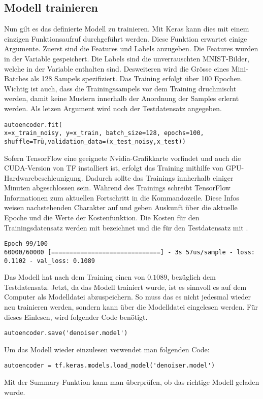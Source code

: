 \subsection{Modell trainieren}
Nun gilt es das definierte Modell zu trainieren.
Mit Keras kann dies mit einem einzigen Funktionsaufruf durchgeführt werden.
Diese Funktion erwartet einige Argumente. Zuerst sind die Features und Labels anzugeben. Die
Features wurden in der Variable  gespeichert. Die Labels
sind die unverrauschten MNIST-Bilder, welche in der Variable  enthalten sind.
Desweiteren wird die Grösse eines Mini-Batches als 128 Sampels spezifiziert. Das
Training erfolgt über 100 Epochen.
Wichtig ist auch, dass die Trainingssampels vor dem Training druchmischt werden, damit keine Mustern
innerhalb der Anordnung der Samples erlernt werden. Als letzen Argument wird noch
der Testdatensatz angegeben.
\begin{verbatim}
autoencoder.fit(
x=x_train_noisy, y=x_train, batch_size=128, epochs=100, shuffle=Trü,validation_data=(x_test_noisy,x_test))
\end{verbatim}
Sofern TensorFlow eine geeignete Nvidia-Grafikkarte vorfindet und auch die
CUDA-Version von TF installiert ist, erfolgt das Training mithilfe von GPU-Hardwarebeschleunigung.
Dadurch sollte das Trainings innherhalb einiger Minuten abgeschlossen sein.
Während des Trainings schreibt TensorFlow Informationen zum aktuellen Fortschritt in die
Kommandozeile. Diese Infos weisen nachstehenden Charakter auf und geben Auskunft über die aktuelle Epoche und die
Werte der Kostenfunktion. Die Kosten für den Trainingsdatensatz werden mit
 bezeichnet und die für den Testdatensatz mit .
\begin{verbatim}
Epoch 99/100
60000/60000 [==============================] - 3s 57us/sample - loss: 0.1102 - val_loss: 0.1089
\end{verbatim}
Das Modell hat nach dem Training einen  von $0.1089$,
bezüglich dem Testdatensatz.
\para{}
Jetzt, da das Modell trainiert wurde, ist es sinnvoll es auf dem Computer als
Modelldatei abzuspeichern.
So muss das es nicht jedesmal wieder neu trainieren werden, sondern kann über
die Modelldatei eingelesen werden. Für dieses Einlesen, wird folgender Code benötigt.
\begin{verbatim}
autoencoder.save('denoiser.model')
\end{verbatim}
Um das Modell wieder einzulesen verwendet man folgenden Code:
\begin{verbatim}
autoencoder = tf.keras.models.load_model('denoiser.model')
\end{verbatim}
Mit der Summary-Funktion kann man überprüfen, ob das richtige Modell geladen wurde.

